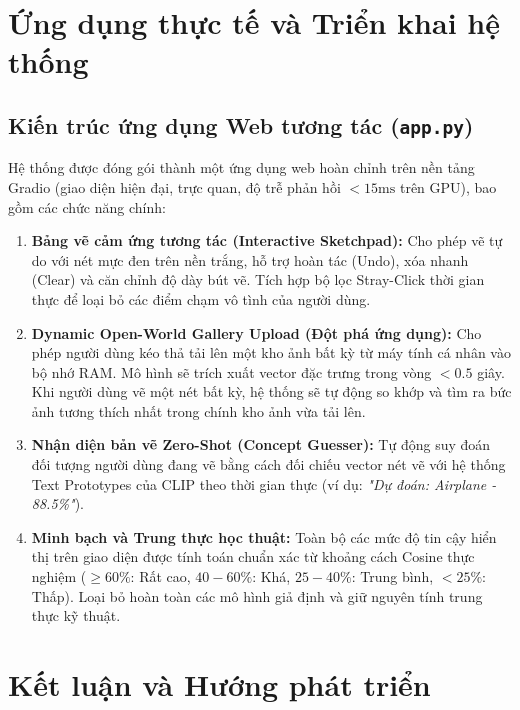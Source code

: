 \documentclass[12pt,a4paper]{report}
\begin{document}
\chapter{Ứng dụng thực tế và Triển khai hệ thống}

\section{Kiến trúc ứng dụng Web tương tác (\texttt{app.py})}
Hệ thống được đóng gói thành một ứng dụng web hoàn chỉnh trên nền tảng Gradio (giao diện hiện đại, trực quan, độ trễ phản hồi $< 15\text{ms}$ trên GPU), bao gồm các chức năng chính:
\begin{enumerate}
    \item \textbf{Bảng vẽ cảm ứng tương tác (Interactive Sketchpad):} Cho phép vẽ tự do với nét mực đen trên nền trắng, hỗ trợ hoàn tác (Undo), xóa nhanh (Clear) và căn chỉnh độ dày bút vẽ. Tích hợp bộ lọc Stray-Click thời gian thực để loại bỏ các điểm chạm vô tình của người dùng.
    \item \textbf{Dynamic Open-World Gallery Upload (Đột phá ứng dụng):} Cho phép người dùng kéo thả tải lên một kho ảnh bất kỳ từ máy tính cá nhân vào bộ nhớ RAM. Mô hình sẽ trích xuất vector đặc trưng trong vòng $< 0.5$ giây. Khi người dùng vẽ một nét bất kỳ, hệ thống sẽ tự động so khớp và tìm ra bức ảnh tương thích nhất trong chính kho ảnh vừa tải lên.
    \item \textbf{Nhận diện bản vẽ Zero-Shot (Concept Guesser):} Tự động suy đoán đối tượng người dùng đang vẽ bằng cách đối chiếu vector nét vẽ với hệ thống Text Prototypes của CLIP theo thời gian thực (ví dụ: \textit{"Dự đoán: Airplane - 88.5\%"}).
    \item \textbf{Minh bạch và Trung thực học thuật:} Toàn bộ các mức độ tin cậy hiển thị trên giao diện được tính toán chuẩn xác từ khoảng cách Cosine thực nghiệm ($\ge 60\%$: Rất cao, $40-60\%$: Khá, $25-40\%$: Trung bình, $< 25\%$: Thấp). Loại bỏ hoàn toàn các mô hình giả định và giữ nguyên tính trung thực kỹ thuật.
\end{enumerate}

\chapter{Kết luận và Hướng phát triển}
\end{document}
